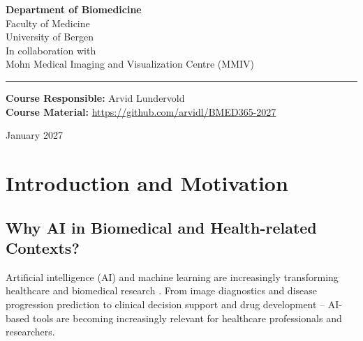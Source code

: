 \documentclass[11pt,a4paper]{article}
\begin{document}
\begin{titlepage}

\vspace{1cm}

{\large
\textbf{Department of Biomedicine}\\
Faculty of Medicine\\
University of Bergen\\[0.5cm]
In collaboration with\\
Mohn Medical Imaging and Visualization Centre (MMIV)
}

\vspace{0.8cm}

\rule{0.6\textwidth}{0.4pt}

\vspace{0.5cm}

{\normalsize
\textbf{Course Responsible:} Arvid Lundervold\\[0.2cm]
\textbf{Course Material:} \url{https://github.com/arvidl/BMED365-2027}
}

\vfill
{\footnotesize January 2027}

\end{titlepage}

\tableofcontents
\newpage

\section{Introduction and Motivation}

\subsection{Why AI in Biomedical and Health-related Contexts?}

Artificial intelligence (AI) and machine learning are increasingly transforming healthcare and biomedical research \citep{topol2019high, goh2026superintelligence}. From image diagnostics and disease progression prediction to clinical decision support and drug development -- AI-based tools are becoming increasingly relevant for healthcare professionals and researchers.
\end{document}

